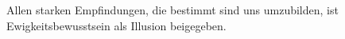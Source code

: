 Allen starken Empfindungen, die bestimmt sind uns umzubilden, ist Ewigkeitsbewusstsein als Illusion beigegeben.
\par

